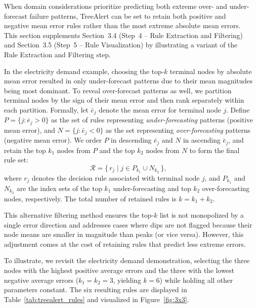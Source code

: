 \documentclass[]{interact}
\theoremstyle{plain}
\theoremstyle{definition}
\theoremstyle{remark}
\begin{document}
When domain considerations prioritize predicting both extreme over- and under-forecast
failure patterns, TreeAlert can be set to retain both positive and negative mean error rules
rather than the most extreme absolute mean errors. This section supplements
Section~3.4 (Step~4 -- Rule Extraction and Filtering) and Section~3.5 (Step~5 -- Rule
Visualization) by illustrating a variant of the Rule Extraction and Filtering step.

In the electricity demand example, choosing the top-$k$ terminal nodes by absolute mean
error resulted in only under-forecast patterns due to their mean magnitudes being most
dominant. To reveal over-forecast patterns as well, we partition terminal nodes by the sign
of their mean error and then rank separately within each partition. Formally, let
$\bar{e}_j$ denote the mean error for terminal node $j$. Define $P=\{j:\bar{e}_j>0\}$ as
the set of rules representing \textit{under-forecasting} patterns (positive mean error), and
$N=\{j:\bar{e}_j<0\}$ as the set representing \textit{over-forecasting} patterns (negative
mean error). We order $P$ in descending $\bar{e}_j$ and $N$ in ascending $\bar{e}_j$, and
retain the top $k_1$ nodes from $P$ and the top $k_2$ nodes from $N$ to form the final
rule set:
\begin{equation}
\mathcal{R} = \{\, r_j \;|\; j \in P_{k_1} \cup N_{k_2} \,\},
\end{equation}
where $r_j$ denotes the decision rule associated with terminal node $j$, and $P_{k_1}$ and
$N_{k_2}$ are the index sets of the top $k_1$ under-forecasting and top $k_2$
over-forecasting nodes, respectively. The total number of retained rules is $k = k_1 + k_2$.

This alternative filtering method ensures the top-$k$ list is not monopolized by a single
error direction and addresses cases where dips are not flagged because their node means are
smaller in magnitude than peaks (or vice versa). However, this adjustment comes at the cost
of retaining rules that predict less extreme errors.

To illustrate, we revisit the electricity demand demonstration, selecting the three nodes
with the highest positive average errors and the three with the lowest negative average
errors ($k_1 = k_2 = 3$, yielding $k = 6$) while holding all other parameters constant.
The six resulting rules are displayed in Table~\ref{tab:treealert_rules} and visualized in
Figure~\ref{fig:3x3}.
\end{document}
